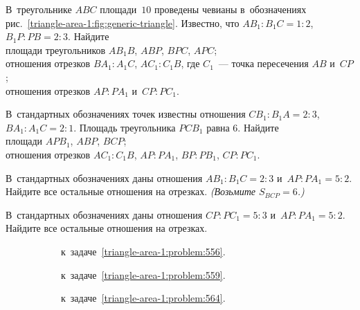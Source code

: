 \begin{problems}

\item
В~треугольнике $ABC$ площади~$10$ проведены чевианы в~обозначениях
рис.~\ref{triangle-area-1:fig:generic-triangle}.
Известно, что $A B_1 : B_1 C = 1 : 2$, $B_1 P : P B = 2 : 3$.
Найдите
\\
\subproblem
площади треугольников $A B_1 B$, $ABP$, $BPC$, $APC$;
\\
\subproblem
отношения отрезков $B A_1 : A_1 C$, $A C_1 : C_1 B$, где $C_1$~--- точка
пересечения $AB$ и~$CP$;
\\
\subproblem
отношения отрезков $AP : P A_1$ и~$CP : P C_1$.

\item
В~стандартных обозначениях точек известны отношения
$C B_1 : B_1 A = 2 : 3$, $B A_1 : A_1 C = 2 : 1$.
Площадь треугольника $P C B_1$ равна $6$.
Найдите
\\
\subproblem
площади $A P B_1$, $ABP$, $BCP$;
\\
\subproblem
отношения отрезков $A C_1 : C_1 B$, $AP : P A_1$, $BP : P B_1$, $CP : P C_1$.

\item
В~стандартных обозначениях даны отношения $A B_1 : B_1 C = 2 : 3$
и~$AP : P A_1 = 5 : 2$.
Найдите все остальные отношения на отрезках.
\emph{(Возьмите $S_{BCP} = 6$.)}

\item
В~стандартных обозначениях даны отношения $CP : P C_1 = 5 : 3$
и~$AP : P A_1 = 5 : 2$.
Найдите все остальные отношения на отрезках.

\begin{figure}[hb]
\leavevmode\null\hfill
    \begin{subfigure}{0.3\textwidth}
        \caption{к~задаче~\ref{triangle-area-1:problem:556}.}
        \label{triangle-area-1:problem:556:fig}
    \end{subfigure}
\hfill
    \begin{subfigure}{0.3\textwidth}
        \caption{к~задаче~\ref{triangle-area-1:problem:559}.}
        \label{triangle-area-1:problem:559:fig}
    \end{subfigure}
\hfill
    \begin{subfigure}{0.3\textwidth}
        \caption{к~задаче~\ref{triangle-area-1:problem:564}.}
        \label{triangle-area-1:problem:564:fig}
    \end{subfigure}
\hfill\null\par
    \caption{}
\end{figure}


\end{problems}

